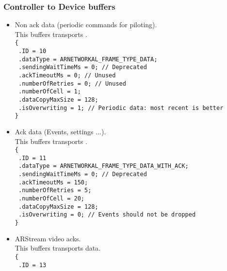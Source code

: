 \subsubsection*{Controller to Device buffers}
\begin{itemize}
\item{
    Non ack data (periodic commands for piloting).\\
    This buffers transports .\\
    \texttt{\{}\\
    \texttt{  .ID = 10}\\
    \texttt{  .dataType = ARNETWORKAL\_FRAME\_TYPE\_DATA;}\\
    \texttt{  .sendingWaitTimeMs = 0; // Deprecated}\\
    \texttt{  .ackTimeoutMs = 0; // Unused}\\
    \texttt{  .numberOfRetries = 0; // Unused}\\
    \texttt{  .numberOfCell = 1;}\\
    \texttt{  .dataCopyMaxSize = 128;}\\
    \texttt{  .isOverwriting = 1; // Periodic data: most recent is better}\\
    \texttt{\}}
}
\item{
    Ack data (Events, settings ...).\\
    This buffers transports .\\
    \texttt{\{}\\
    \texttt{  .ID = 11}\\
    \texttt{  .dataType = ARNETWORKAL\_FRAME\_TYPE\_DATA\_WITH\_ACK;}\\
    \texttt{  .sendingWaitTimeMs = 0; // Deprecated}\\
    \texttt{  .ackTimeoutMs = 150;}\\
    \texttt{  .numberOfRetries = 5;}\\
    \texttt{  .numberOfCell = 20;}\\
    \texttt{  .dataCopyMaxSize = 128;}\\
    \texttt{  .isOverwriting = 0; // Events should not be dropped}\\
    \texttt{\}}
}
\item{
    ARStream video acks.\\
    This buffers transports  data.\\
    \texttt{\{}\\
    \texttt{  .ID = 13}\\
}
\end{itemize}
